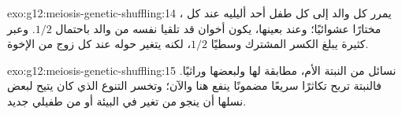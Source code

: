 \begin{solution}{exo:g12:meiosis-genetic-shuffling:14}
يمرر كل والد إلى كل طفل أحد أليليه عند كل ، مختارًا عشوائيًا؛
وعند  بعينها، يكون أخوان قد تلقيا  نفسه من والد باحتمال
$1/2$. وعبر  كثيرة يبلغ الكسر المشترك وسطيًا $1/2$، لكنه يتغير
حوله عند كل زوج من الإخوة.
\end{solution}

\begin{solution}{exo:g12:meiosis-genetic-shuffling:15}
نسائل من النبتة الأم، مطابقة لها ولبعضها وراثيًا. فالنبتة تربح تكاثرًا
سريعًا مضمونًا  ينفع هنا والآن؛ وتخسر التنوع الذي كان يتيح
لبعض نسلها أن ينجو من تغير في البيئة أو من طفيلي جديد.
\end{solution}

